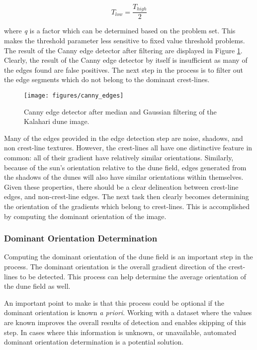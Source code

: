 \begin{equation}
T_{low}=\frac{T_{high}}{2}
\end{equation}

where \emph{q} is a factor which can be determined based on the problem set. This makes the threshold parameter less sensitive to fixed value threshold problems. The result of the Canny edge detector after filtering are displayed in Figure \ref{fig:canny_edges}. Clearly, the result of the Canny edge detector by itself is insufficient as many of the edges found are false positives. The next step in the process is to filter out the edge segments which do not belong to the dominant crest-lines.

 \begin{figure}
 	\centering
 	\texttt{[image: figures/canny\_edges]}
 	\caption{Canny edge detector after median and Gaussian filtering of the Kalahari dune image.}
 	\label{fig:canny_edges}
 \end{figure}
 
 Many of the edges provided in the edge detection step are noise, shadows, and non crest-line textures. However, the crest-lines all have one distinctive feature in common: all of their gradient have relatively similar orientations. Similarly, because of the sun's orientation relative to the dune field, edges generated from the shadows of the dunes will also have similar orientations within themselves. Given these properties, there should be a clear delineation between crest-line edges, and non-crest-line edges. The next task then clearly becomes determining the orientation of the gradients which belong to crest-lines. This is accomplished by computing the dominant orientation of the image.
 
 \subsubsection*{Dominant Orientation Determination} \label{subsec:dominant_orientation}
 
 Computing the dominant orientation of the dune field is an important step in the process. The dominant orientation is the overall gradient direction of the crest-lines to be detected. This process can help determine the average orientation of the dune field as well. 
 
 An important point to make is that this process could be optional if the dominant orientation is known \emph{a priori}. Working with a dataset where the values are known improves the overall results of detection and enables skipping of this step. In cases where this information is unknown, or unavailable, automated dominant orientation determination is a potential solution.
 
